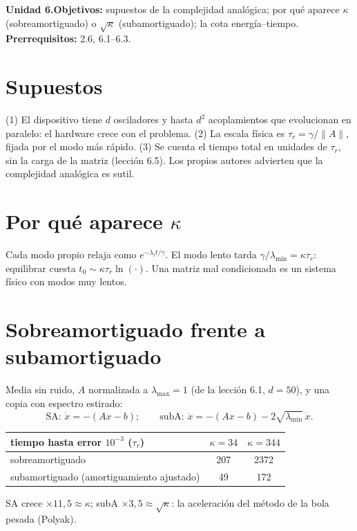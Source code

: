 \documentclass[11pt,a4paper]{article}
\begin{document}

\noindent\textbf{Unidad 6.}\quad\textbf{Objetivos:} supuestos de la complejidad analógica; por qué aparece $\kappa$ (sobreamortiguado) o $\sqrt\kappa$ (subamortiguado);
la cota energía--tiempo.
\textbf{Prerrequisitos:} 2.6, 6.1--6.3.

\section{Supuestos}
(1) El dispositivo tiene $d$ osciladores y hasta $d^2$ acoplamientos que evolucionan en paralelo: el hardware crece con el problema. (2) La escala física es
$\tau_r=\gamma/\|A\|$, fijada por el modo más rápido. (3) Se cuenta el tiempo total en unidades de $\tau_r$, sin la carga de la matriz (lección 6.5). Los propios
autores advierten que la complejidad analógica es sutil.

\section{Por qué aparece \texorpdfstring{$\kappa$}{kappa}}
Cada modo propio relaja como $e^{-\lambda_it/\gamma}$. El modo lento tarda $\gamma/\lambda_{\min}=\kappa\tau_r$: equilibrar cuesta $t_0\sim\kappa\tau_r\ln(\cdot)$. Una matriz
mal condicionada es un sistema físico con modos muy lentos.

\section{Sobreamortiguado frente a subamortiguado \evS}
Media sin ruido, $A$ normalizada a $\lambda_{\max}=1$ (de la lección 6.1, $d=50$), y una copia con espectro estirado:
\[\text{SA: }\dot x=-(Ax-b);\qquad\text{subA: }\ddot x=-(Ax-b)-2\sqrt{\lambda_{\min}}\,\dot x.\]
\begin{center}\begin{tabular}{lcc}\toprule
tiempo hasta error $10^{-3}$ ($\tau_r$) & $\kappa=34$ & $\kappa=344$\\\midrule
sobreamortiguado & 207 & 2372\\
subamortiguado (amortiguamiento ajustado) & 49 & 172\\\bottomrule\end{tabular}\end{center}
SA crece $\times11{,}5\approx\kappa$; subA $\times3{,}5\approx\sqrt\kappa$: la aceleración del método de la bola pesada (Polyak).
\end{document}
